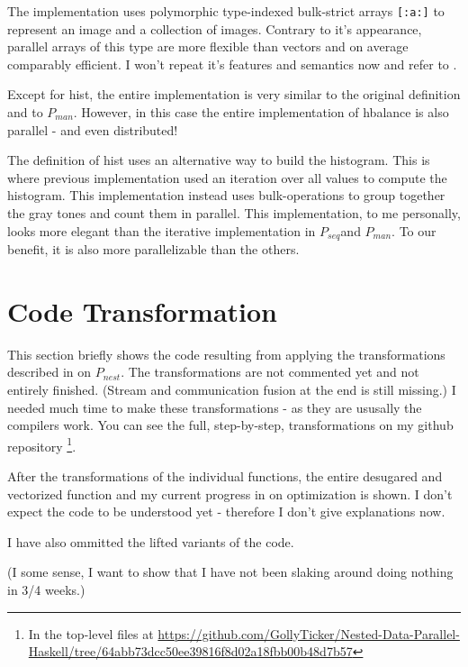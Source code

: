 \documentclass{article}
\newcommand{\seq}[0]{$P_{seq}$}
\newcommand{\man}[0]{$P_{man}$}
\newcommand{\ndpn}[0]{$P_{nest}$}
\newcommand{\note}[1]{{\tiny (#1)}}
\begin{document}
      
      
      The implementation uses polymorphic type-indexed bulk-strict arrays \lstinline|[:a:]|
      to represent an image and a collection of images.
      Contrary to it's appearance, parallel arrays of this type are more
      flexible than vectors and on average comparably efficient. I won't
      repeat it's features and semantics now and refer to \cite{Harness2008}.
      
      Except for hist, the entire implementation is very similar to the original definition
      and to \man. However, in this case the entire implementation
      of hbalance is also parallel - and even distributed!
      
      The definition of hist uses an alternative way to build the histogram.
      This is where previous implementation used an iteration
      over all values to compute the histogram. This implementation instead
      uses bulk-operations to group together the gray tones and count them in parallel.
      This implementation, to me personally, looks more elegant than the iterative
      implementation in \seq and \man. To our benefit, it is also more parallelizable
      than the others.
  
  \newpage
  
  \section{Code Transformation}
    This section briefly shows the code resulting from applying
    the transformations described in \cite{Harness2008} on \ndpn.
    The transformations are not commented yet and not entirely finished.
    (Stream and communication fusion at the end is still missing.)
    I needed much time to make these transformations - as they are ususally
    the compilers work. You can see the full, step-by-step, transformations on my github repository \footnote[1]{In the top-level files at \url{https://github.com/GollyTicker/Nested-Data-Parallel-Haskell/tree/64abb73dcc50ee39816f8d02a18fbb00b48d7b57}}.

    After the transformations of the individual functions, the entire
    desugared and vectorized function and my current progress in on optimization is shown.
    I don't expect the code to be understood yet - therefore I don't give explanations now.
    
    I have also ommitted the lifted variants of the code.
    
    \note{I some sense, I want to show that I have not been slaking around doing nothing in 3/4 weeks.}
    
\end{document}
